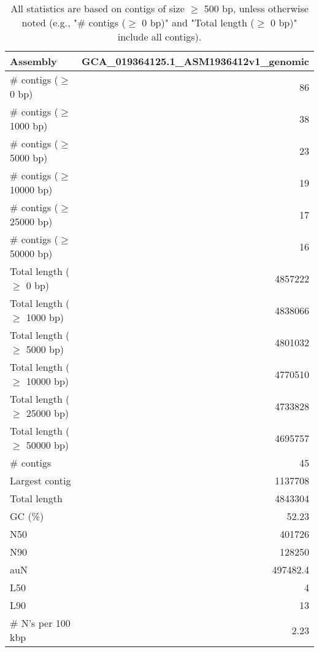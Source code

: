 \documentclass[12pt,a4paper]{article}
\begin{document}
\begin{table}[ht]
\begin{center}
\caption{All statistics are based on contigs of size $\geq$ 500 bp, unless otherwise noted (e.g., "\# contigs ($\geq$ 0 bp)" and "Total length ($\geq$ 0 bp)" include all contigs).}
\begin{tabular}{|l*{1}{|r}|}
\hline
Assembly & GCA\_019364125.1\_ASM1936412v1\_genomic \\ \hline
\# contigs ($\geq$ 0 bp) & 86 \\ \hline
\# contigs ($\geq$ 1000 bp) & 38 \\ \hline
\# contigs ($\geq$ 5000 bp) & 23 \\ \hline
\# contigs ($\geq$ 10000 bp) & 19 \\ \hline
\# contigs ($\geq$ 25000 bp) & 17 \\ \hline
\# contigs ($\geq$ 50000 bp) & 16 \\ \hline
Total length ($\geq$ 0 bp) & 4857222 \\ \hline
Total length ($\geq$ 1000 bp) & 4838066 \\ \hline
Total length ($\geq$ 5000 bp) & 4801032 \\ \hline
Total length ($\geq$ 10000 bp) & 4770510 \\ \hline
Total length ($\geq$ 25000 bp) & 4733828 \\ \hline
Total length ($\geq$ 50000 bp) & 4695757 \\ \hline
\# contigs & 45 \\ \hline
Largest contig & 1137708 \\ \hline
Total length & 4843304 \\ \hline
GC (\%) & 52.23 \\ \hline
N50 & 401726 \\ \hline
N90 & 128250 \\ \hline
auN & 497482.4 \\ \hline
L50 & 4 \\ \hline
L90 & 13 \\ \hline
\# N's per 100 kbp & 2.23 \\ \hline
\end{tabular}
\end{center}
\end{table}
\end{document}
